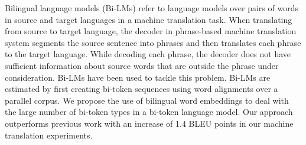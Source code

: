 
%
%

Bilingual language models (Bi-LMs) refer to language models over pairs of words in source and target languages in a machine translation task. When translating from source to target language, the decoder in phrase-based machine translation system segments the source sentence into phrases and then translates each phrase to the target language. While decoding each phrase, the decoder does not have sufficient information about source words that are outside the phrase under consideration. Bi-LMs have been used to tackle this problem. Bi-LMs are estimated by first creating bi-token sequences using word alignments over a parallel corpus. We propose the use of bilingual word embeddings to deal with the large number of bi-token types in a bi-token language model. Our approach outperforms previous work with an increase of 1.4 BLEU points in our machine translation experiments.







